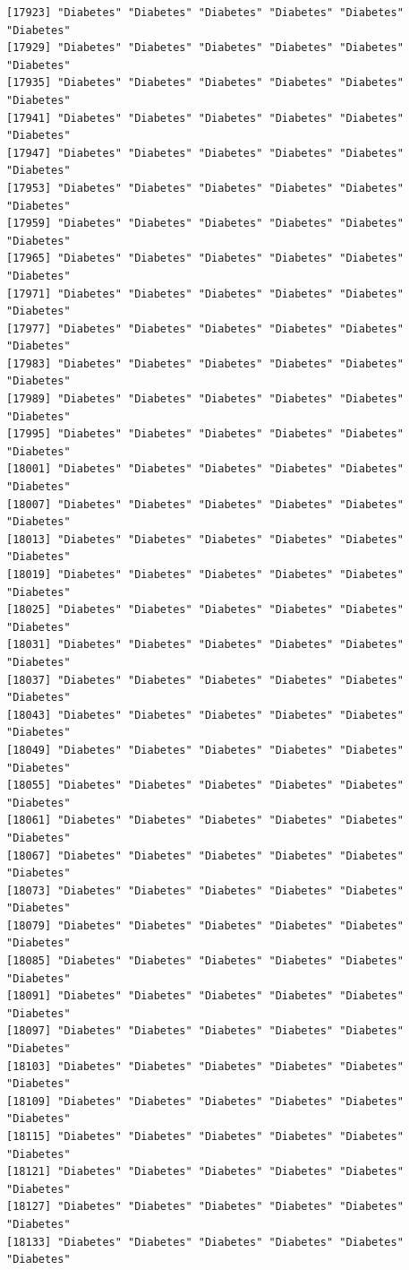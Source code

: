 \documentclass[
  letterpaper,
  DIV=11,
  numbers=noendperiod]{scrartcl}
\begin{document}
\begin{verbatim}
[17923] "Diabetes" "Diabetes" "Diabetes" "Diabetes" "Diabetes" "Diabetes"
[17929] "Diabetes" "Diabetes" "Diabetes" "Diabetes" "Diabetes" "Diabetes"
[17935] "Diabetes" "Diabetes" "Diabetes" "Diabetes" "Diabetes" "Diabetes"
[17941] "Diabetes" "Diabetes" "Diabetes" "Diabetes" "Diabetes" "Diabetes"
[17947] "Diabetes" "Diabetes" "Diabetes" "Diabetes" "Diabetes" "Diabetes"
[17953] "Diabetes" "Diabetes" "Diabetes" "Diabetes" "Diabetes" "Diabetes"
[17959] "Diabetes" "Diabetes" "Diabetes" "Diabetes" "Diabetes" "Diabetes"
[17965] "Diabetes" "Diabetes" "Diabetes" "Diabetes" "Diabetes" "Diabetes"
[17971] "Diabetes" "Diabetes" "Diabetes" "Diabetes" "Diabetes" "Diabetes"
[17977] "Diabetes" "Diabetes" "Diabetes" "Diabetes" "Diabetes" "Diabetes"
[17983] "Diabetes" "Diabetes" "Diabetes" "Diabetes" "Diabetes" "Diabetes"
[17989] "Diabetes" "Diabetes" "Diabetes" "Diabetes" "Diabetes" "Diabetes"
[17995] "Diabetes" "Diabetes" "Diabetes" "Diabetes" "Diabetes" "Diabetes"
[18001] "Diabetes" "Diabetes" "Diabetes" "Diabetes" "Diabetes" "Diabetes"
[18007] "Diabetes" "Diabetes" "Diabetes" "Diabetes" "Diabetes" "Diabetes"
[18013] "Diabetes" "Diabetes" "Diabetes" "Diabetes" "Diabetes" "Diabetes"
[18019] "Diabetes" "Diabetes" "Diabetes" "Diabetes" "Diabetes" "Diabetes"
[18025] "Diabetes" "Diabetes" "Diabetes" "Diabetes" "Diabetes" "Diabetes"
[18031] "Diabetes" "Diabetes" "Diabetes" "Diabetes" "Diabetes" "Diabetes"
[18037] "Diabetes" "Diabetes" "Diabetes" "Diabetes" "Diabetes" "Diabetes"
[18043] "Diabetes" "Diabetes" "Diabetes" "Diabetes" "Diabetes" "Diabetes"
[18049] "Diabetes" "Diabetes" "Diabetes" "Diabetes" "Diabetes" "Diabetes"
[18055] "Diabetes" "Diabetes" "Diabetes" "Diabetes" "Diabetes" "Diabetes"
[18061] "Diabetes" "Diabetes" "Diabetes" "Diabetes" "Diabetes" "Diabetes"
[18067] "Diabetes" "Diabetes" "Diabetes" "Diabetes" "Diabetes" "Diabetes"
[18073] "Diabetes" "Diabetes" "Diabetes" "Diabetes" "Diabetes" "Diabetes"
[18079] "Diabetes" "Diabetes" "Diabetes" "Diabetes" "Diabetes" "Diabetes"
[18085] "Diabetes" "Diabetes" "Diabetes" "Diabetes" "Diabetes" "Diabetes"
[18091] "Diabetes" "Diabetes" "Diabetes" "Diabetes" "Diabetes" "Diabetes"
[18097] "Diabetes" "Diabetes" "Diabetes" "Diabetes" "Diabetes" "Diabetes"
[18103] "Diabetes" "Diabetes" "Diabetes" "Diabetes" "Diabetes" "Diabetes"
[18109] "Diabetes" "Diabetes" "Diabetes" "Diabetes" "Diabetes" "Diabetes"
[18115] "Diabetes" "Diabetes" "Diabetes" "Diabetes" "Diabetes" "Diabetes"
[18121] "Diabetes" "Diabetes" "Diabetes" "Diabetes" "Diabetes" "Diabetes"
[18127] "Diabetes" "Diabetes" "Diabetes" "Diabetes" "Diabetes" "Diabetes"
[18133] "Diabetes" "Diabetes" "Diabetes" "Diabetes" "Diabetes" "Diabetes"

\end{verbatim}
\end{document}
